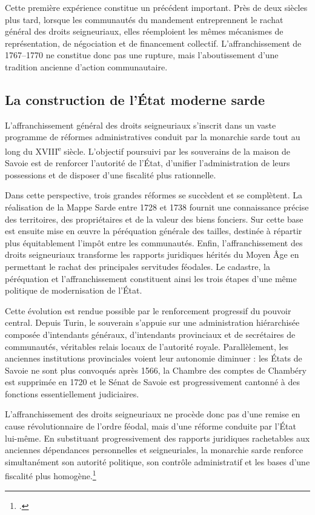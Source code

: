 \documentclass[12pt,a4paper]{report}
\begin{document}
Cette première expérience constitue un précédent important. Près de deux siècles plus tard, lorsque les communautés du mandement entreprennent le rachat général des droits seigneuriaux, elles réemploient les mêmes mécanismes de représentation, de négociation et de financement collectif. L'affranchissement de 1767--1770 ne constitue donc pas une rupture, mais l'aboutissement d'une tradition ancienne d'action communautaire.



\subsection{La construction de l'État moderne sarde}

L'affranchissement général des droits seigneuriaux s'inscrit dans un vaste programme de réformes administratives conduit par la monarchie sarde tout au long du XVIII\textsuperscript{e} siècle. L'objectif poursuivi par les souverains de la maison de Savoie est de renforcer l'autorité de l'État, d'unifier l'administration de leurs possessions et de disposer d'une fiscalité plus rationnelle.

Dans cette perspective, trois grandes réformes se succèdent et se complètent. La réalisation de la Mappe Sarde entre 1728 et 1738 fournit une connaissance précise des territoires, des propriétaires et de la valeur des biens fonciers. Sur cette base est ensuite mise en œuvre la péréquation générale des tailles, destinée à répartir plus équitablement l'impôt entre les communautés. Enfin, l'affranchissement des droits seigneuriaux transforme les rapports juridiques hérités du Moyen Âge en permettant le rachat des principales servitudes féodales. Le cadastre, la péréquation et l'affranchissement constituent ainsi les trois étapes d'une même politique de modernisation de l'État.

Cette évolution est rendue possible par le renforcement progressif du pouvoir central. Depuis Turin, le souverain s'appuie sur une administration hiérarchisée composée d'intendants généraux, d'intendants provinciaux et de secrétaires de communautés, véritables relais locaux de l'autorité royale. Parallèlement, les anciennes institutions provinciales voient leur autonomie diminuer : les États de Savoie ne sont plus convoqués après 1566, la Chambre des comptes de Chambéry est supprimée en 1720 et le Sénat de Savoie est progressivement cantonné à des fonctions essentiellement judiciaires.

L'affranchissement des droits seigneuriaux ne procède donc pas d'une remise en cause révolutionnaire de l'ordre féodal, mais d'une réforme conduite par l'État lui-même. En substituant progressivement des rapports juridiques rachetables aux anciennes dépendances personnelles et seigneuriales, la monarchie sarde renforce simultanément son autorité politique, son contrôle administratif et les bases d'une fiscalité plus homogène.\footcite{Bruchet1908Abolition}
\end{document}
